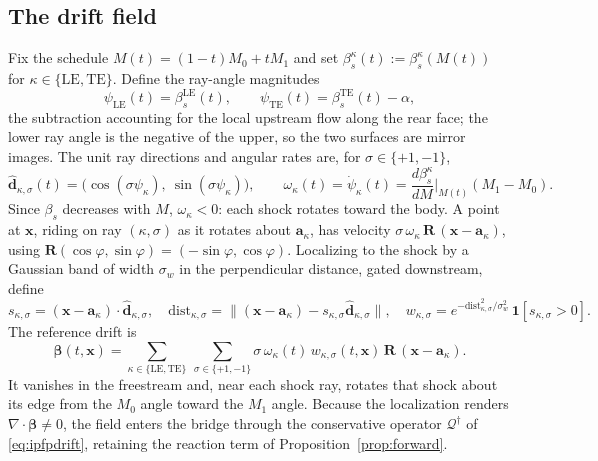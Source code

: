 \documentclass[11pt]{article}
\theoremstyle{remark}
\newcommand{\R}{\mathbf{R}}
\newcommand{\xv}{\mathbf{x}}
\newcommand{\bt}{\boldsymbol{\beta}}
\newcommand{\dhat}{\hat{\mathbf{d}}}
\newcommand{\av}{\mathbf{a}}
\newcommand{\grad}{\nabla}
\newcommand{\dive}{\grad\!\cdot\!}
\begin{document}
\subsection{The drift field}
Fix the schedule $M(t)=(1-t)M_0+tM_1$ and set
$\beta_s^{\kappa}(t):=\beta_s^{\kappa}(M(t))$ for $\kappa\in\{\mathrm{LE},\mathrm{TE}\}$.
Define the ray-angle magnitudes
\begin{equation}
\psi_{\mathrm{LE}}(t)=\beta_s^{\mathrm{LE}}(t),\qquad
\psi_{\mathrm{TE}}(t)=\beta_s^{\mathrm{TE}}(t)-\alpha,
\end{equation}
the subtraction accounting for the local upstream flow along the rear face; the
lower ray angle is the negative of the upper, so the two surfaces are mirror
images. The unit ray directions and angular rates are, for $\sigma\in\{+1,-1\}$,
\begin{equation}
\dhat_{\kappa,\sigma}(t)=\bigl(\cos(\sigma\psi_\kappa),\ \sin(\sigma\psi_\kappa)\bigr),
\qquad
\omega_\kappa(t)=\dot\psi_\kappa(t)=\frac{d\beta_s^{\kappa}}{dM}\Big|_{M(t)}(M_1-M_0).
\end{equation}
Since $\beta_s$ decreases with $M$, $\omega_\kappa<0$: each shock rotates toward
the body. A point at $\xv$, riding on ray $(\kappa,\sigma)$ as it rotates about
$\av_\kappa$, has velocity $\sigma\,\omega_\kappa\,\R\,(\xv-\av_\kappa)$, using
$\R(\cos\varphi,\sin\varphi)=(-\sin\varphi,\cos\varphi)$. Localizing to the shock
by a Gaussian band of width $\sigma_w$ in the perpendicular distance, gated
downstream, define
\begin{equation}
s_{\kappa,\sigma}=(\xv-\av_\kappa)\cdot\dhat_{\kappa,\sigma},\quad
\mathrm{dist}_{\kappa,\sigma}=\bigl\|(\xv-\av_\kappa)-s_{\kappa,\sigma}\dhat_{\kappa,\sigma}\bigr\|,\quad
w_{\kappa,\sigma}=e^{-\mathrm{dist}_{\kappa,\sigma}^2/\sigma_w^2}\,\mathbf{1}[s_{\kappa,\sigma}>0].
\end{equation}
The reference drift is
\begin{equation}
\boxed{\;
\bt(t,\xv)=\sum_{\kappa\in\{\mathrm{LE},\mathrm{TE}\}}\ \sum_{\sigma\in\{+1,-1\}}
\sigma\,\omega_\kappa(t)\,w_{\kappa,\sigma}(t,\xv)\,\R\,(\xv-\av_\kappa).
\;}
\end{equation}
It vanishes in the freestream and, near each shock ray, rotates that shock about
its edge from the $M_0$ angle toward the $M_1$ angle. Because the localization
renders $\dive\bt\neq0$, the field enters the bridge through the conservative
operator $\mathcal{Q}^{\dagger}$ of \eqref{eq:ipfpdrift}, retaining the reaction
term of Proposition~\ref{prop:forward}.
\end{document}
